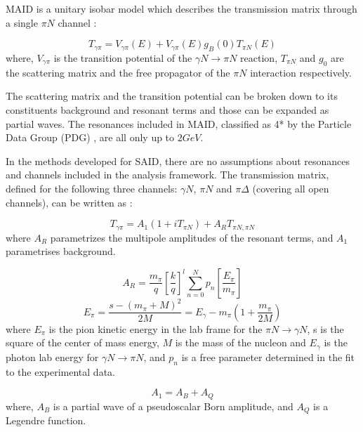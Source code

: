 \indent MAID is a unitary isobar model which describes the transmission matrix through a single $\pi N$ channel \cite {drechsel}:

\begin{equation}
T_{\gamma\pi}=V_{\gamma\pi}(E)+V_{\gamma\pi}(E)g_{B}(0)T_{\pi N}(E)
\end{equation}
where, $V_{\gamma\pi}$ is the transition potential of the $\gamma N\rightarrow \pi N$ reaction, $T_{\pi N}$ and $g_{0}$ are the scattering matrix and the free propagator of the $\pi N$ interaction respectively.

\indent The scattering matrix and the transition potential can be broken down to its constituents background and resonant terms and those can be expanded as partial waves. The resonances included in MAID, classified as 4* by the Particle Data Group (PDG) \cite{pda}, are all only up to $2GeV$.

\indent In the methods developed for SAID, there are no assumptions about resonances and channels included in the analysis framework. The transmission matrix, defined for the following three channels: $\gamma N$, $\pi N$ and $\pi \Delta$ (covering all open channels), can be written as \cite{arndt}:

\begin{equation}
T_{\gamma\pi}=A_{1}(1+iT_{\pi N})+A_{R}T_{\pi N,\pi N}
\end{equation}
where $A_{R}$ parametrizes the multipole amplitudes of the resonant terms, and $A_{1}$ parametrises background.

\begin{equation}
A_{R}=\frac{m_{\pi}}{q}\left[\frac{k}{q}\right]^{l}\sum\limits_{n=0}^{N}p_{n}\left[\frac{E_{\pi}}{m_{\pi}}\right]
\end{equation}
\begin{equation}
E_{\pi}=\frac{s-(m_{\pi}+M)^{2}}{2M}=E_{\gamma}-m_{\pi}(1+\frac{m_{\pi}}{2M})
\end{equation}
where $E_{\pi}$ is the pion kinetic energy in the lab frame for the $\pi N\rightarrow \gamma N$, s is the square of the center of mass energy, $M$ is the mass of the nucleon and $E_{\gamma}$ is the photon lab energy for $\gamma N \rightarrow \pi N$, and $p_{n}$ is a free parameter determined in the fit to the experimental data.

\begin{equation}
A_{1}=A_{B}+A_{Q}
\end{equation}
where, $A_{B}$ is a partial wave of a pseudoscalar Born amplitude, and $A_{Q}$ is a Legendre function.

